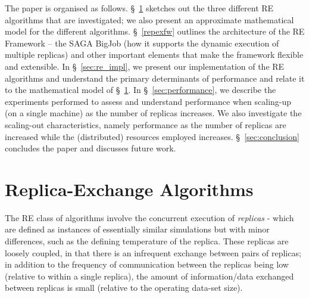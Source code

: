 \documentclass{rspublic}
\newcommand{\jhanote}[1]{ {\textcolor{red} { ***shantenu: #1 }}}
\newcommand{\alnote}[1]{ {\textcolor{blue} { ***andre: #1 }}}
\newcommand{\athotanote}[1]{ {\textcolor{green} { ***athota: #1 }}}
\newcommand{\alnote}[1]{}
\newcommand{\athotanote}[1]{}
\newcommand{\jhanote}[1]{}
\begin{document}
The paper is organised as follows. \S~\ref{sec:repex-approach}
sketches out the three different RE algorithms that are investigated; 
we also present an approximate mathematical model for the different algorithms.  
\S~\ref{repexfw} outlines the architecture of the RE Framework -- the SAGA BigJob
(how it supports the dynamic execution of multiple replicas) and other
important elements that make the framework flexible and extensible.
In \S~\ref{sec:re_impl}, we present our implementation of the RE algorithms and
understand the primary determinants of performance and relate it to
the mathematical model of \S~\ref{sec:repex-approach}.  
In \S~\ref{sec:performance}, we describe the experiments performed 
to assess and understand performance when scaling-up (on a single machine) 
as the number of replicas increases. We also investigate the scaling-out
characteristics, namely performance as the number of replicas are
increased while the (distributed) resources employed
increases. %
\S~\ref{sec:conclusion} concludes the paper and discusses future work.


\section{Replica-Exchange Algorithms}\label{sec:repex-approach}

The RE class of algorithms involve the concurrent execution of
\emph{replicas} - which are defined as instances of essentially
similar simulations but with minor differences, such as the defining
temperature of the replica. These replicas are loosely coupled, in
that there is an infrequent exchange between pairs of 
replicas; in addition to the frequency of communication between the
replicas being low (relative to within a single replica), the amount
of information/data exchanged between replicas is small (relative to
the operating data-set size).

\end{document}
